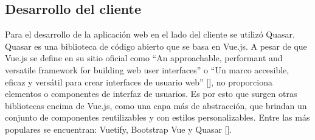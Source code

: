 \subsection{Desarrollo del cliente}
Para el desarrollo de la aplicación web en el lado del cliente se utilizó Quasar. 
Quasar es una biblioteca de código abierto que se basa en Vue.js.
A pesar de que Vue.js se define en su sitio oficial como ``An approachable, performant and versatile framework for building web user interfaces''
o ``Un marco accesible, eficaz y versátil para crear interfaces de usuario web'' [\cite{vuejs}],
no proporciona elementos o componentes de interfaz de usuarios. Es por esto que surgen  
otras bibliotecas encima de Vue.js, como una capa más de abstracción, que 
brindan un conjunto de componentes reutilizables y con estilos personalizables. Entre 
las más populares se encuentran: Vuetify, Bootstrap Vue y Quasar [\cite{vuejs-frameworks}].







